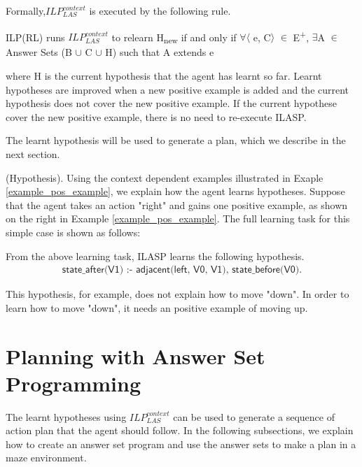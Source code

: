 Formally,$ILP_{LAS}^{context}$ is executed by the following rule.
\begin{defn}\label{def:ILASP_run}
ILP(RL) runs $ILP_{LAS}^{context}$ to relearn H\textsubscript{new} if and only if $\forall$$\langle$ e, C$\rangle$ $\in$ E\textsuperscript{+}, $\exists$A $\in$ Answer Sets (B $\cup$ C $\cup$ H) such that A extends e
\end{defn}
where H is the current hypothesis that the agent has learnt so far. 
Learnt hypotheses are improved when a new positive example is added and the current hypothesis does not cover the new positive example.
If the current hypothese cover the new positive example, there is no need to re-execute ILASP.

The learnt hypothesis will be used to generate a plan, which we describe in the next section.

\begin{examp} \normalfont (Hypothesis).
Using the context dependent examples illustrated in Exaple \ref{example_pos_example}, we explain how the agent learns hypotheses.
Suppose that the agent takes an action "right" and gains one positive example, as shown on the right in Example \ref{example_pos_example}. 
The full learning task for this simple case is shown as follows:


From the above learning task, ILASP learns the following hypothesis.
\begin{equation}
\begin{split}
\textsf{state\_after(V1) :- adjacent(left, V0, V1), state\_before(V0).}
\end{split}
\end{equation}



This hypothesis, for example, does not explain how to move "down". In order to learn how to move "down", it needs an positive example of moving up.
\end{examp}

\section{Planning with Answer Set Programming}
\label{sec:planning}

The learnt hypotheses using $ILP_{LAS}^{context}$ can be used to generate a sequence of action plan that the agent should follow.
In the following subsections, we explain how to create an answer set program and use the answer sets to make a plan in a maze environment.
